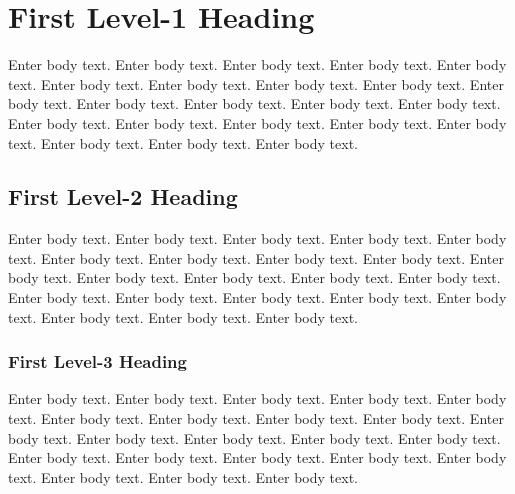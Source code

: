 \documentclass[]{nrel}
\begin{document}
\clearpage
\tableofcontents
\listoffigures
\listoftables

\mainmatter
\pagestyle{fancy}
\chapter{First Level-1 Heading } %

\label{sec:First Level-1 Heading}

Enter body text. Enter body text. Enter body text. Enter body text. Enter body text. Enter body text. Enter body text. Enter body text. Enter body text. Enter body text. Enter body text. Enter body text. Enter body text. Enter body text. Enter body text. Enter body text. Enter body text. Enter body text. Enter body text. Enter body text. Enter body text. Enter body text. 

\section{First Level-2 Heading}
\label{sec:First Level-2 Heading}
Enter body text. Enter body text. Enter body text. Enter body text. Enter body text. Enter body text. Enter body text. Enter body text. Enter body text. Enter body text. Enter body text. Enter body text. Enter body text. Enter body text. Enter body text. Enter body text. Enter body text. Enter body text. Enter body text. Enter body text. Enter body text. Enter body text.

\subsection{First Level-3 Heading}
\label{First Level-3 Heading}
Enter body text. Enter body text. Enter body text. Enter body text. Enter body text. Enter body text. Enter body text. Enter body text. Enter body text. Enter body text. Enter body text. Enter body text. Enter body text. Enter body text. Enter body text. Enter body text. Enter body text. Enter body text. Enter body text. Enter body text. Enter body text. Enter body text.


\end{document}
